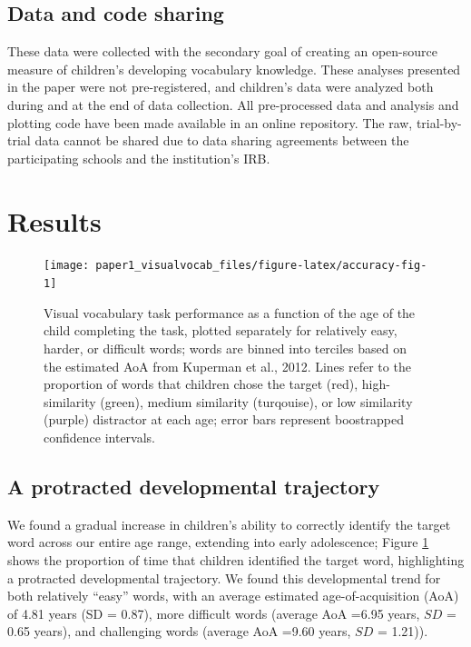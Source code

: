 \documentclass[
  man,mask]{apa6}
\begin{document}
\subsection{Data and code sharing}\label{data-and-code-sharing}

These data were collected with the secondary goal of creating an open-source measure of children's developing vocabulary knowledge. These analyses presented in the paper were not pre-registered, and children's data were analyzed both during and at the end of data collection. All pre-processed data and analysis and plotting code have been made available in an online repository. The raw, trial-by-trial data cannot be shared due to data sharing agreements between the participating schools and the institution's IRB.

\section{Results}\label{results}

\begin{figure}[H]

{\centering \texttt{[image: paper1\_visualvocab\_files/figure-latex/accuracy-fig-1]} 

}

\caption{Visual vocabulary task performance as a function of the age of the child completing the task, plotted separately for relatively easy, harder, or difficult words; words are binned into terciles based on the estimated AoA from Kuperman et al., 2012. Lines refer to the proportion of words that children chose the target (red), high-similarity (green), medium similarity (turqouise), or low similarity (purple) distractor  at each age; error bars represent boostrapped confidence intervals.}\label{fig:accuracy-fig}
\end{figure}

\subsection{A protracted developmental trajectory}\label{a-protracted-developmental-trajectory}

We found a gradual increase in children's ability to correctly identify the target word across our entire age range, extending into early adolescence; Figure \ref{fig:accuracy-fig} shows the proportion of time that children identified the target word, highlighting a protracted developmental trajectory. We found this developmental trend for both relatively ``easy'' words, with an average estimated age-of-acquisition (AoA) of 4.81 years (SD = 0.87), more difficult words (average AoA =6.95 years, \(SD\) = 0.65 years), and challenging words (average AoA =9.60 years, \(SD\) = 1.21)).
\end{document}
